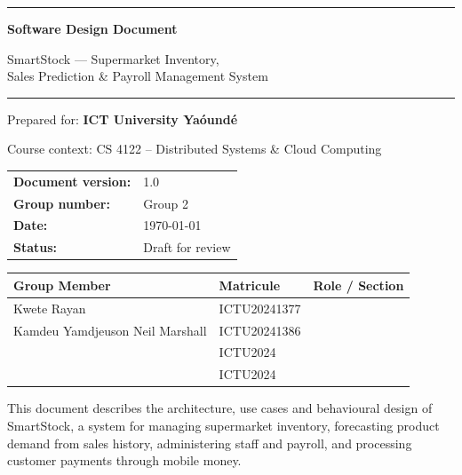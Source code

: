 \documentclass[11pt,a4paper]{report}
\newcommand{\sysname}{SmartStock}
\begin{document}
\begin{titlepage}
\begin{center}
\vspace*{1.5cm}

{\color{primary}\rule{\linewidth}{2pt}}

\vspace{0.8cm}
{\Huge\bfseries\color{primary} Software Design Document}

\vspace{0.4cm}
{\LARGE\color{primarydark} \sysname{} --- Supermarket Inventory,\\[2pt] Sales Prediction \& Payroll Management System}

\vspace{0.6cm}
{\color{primary}\rule{\linewidth}{2pt}}

\vspace{2.5cm}

{\Large Prepared for: \textbf{ICT University Ya\'ound\'e}}

\vspace{0.3cm}
{\large Course context: CS 4122 -- Distributed Systems \& Cloud Computing}

\vspace{2cm}

\begin{tabular}{ll}
\textbf{Document version:} & 1.0 \\[4pt]
\textbf{Group number:} & Group 2 \\[4pt]
\textbf{Date:} & \today \\[4pt]
\textbf{Status:} & Draft for review \\
\end{tabular}

\vspace{1cm}

\begin{tabular}{@{}p{5.5cm}p{4cm}p{4.5cm}@{}}
\toprule
\textbf{Group Member} & \textbf{Matricule} & \textbf{Role / Section} \\
\midrule
Kwete Rayan & ICTU20241377 & \\
Kamdeu Yamdjeuson Neil Marshall & ICTU20241386 & \\
 & ICTU2024 & \\
 & ICTU2024 & \\
\bottomrule
\end{tabular}

\vfill

{\small\color{bodytext} This document describes the architecture, use cases and behavioural design of \sysname{}, a system for managing supermarket inventory, forecasting product demand from sales history, administering staff and payroll, and processing customer payments through mobile money.}

\end{center}
\end{titlepage}
\end{document}

